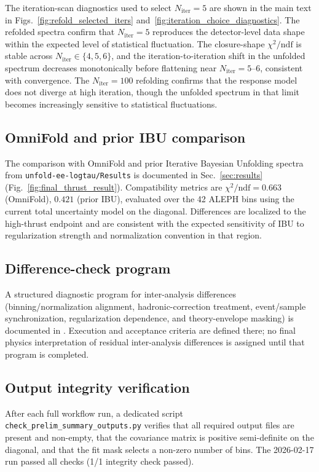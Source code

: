The iteration-scan diagnostics used to select $N_{\mathrm{iter}}=5$ are shown in the main text in Figs.~\ref{fig:refold_selected_iters} and~\ref{fig:iteration_choice_diagnostics}. The refolded spectra confirm that $N_{\mathrm{iter}}=5$ reproduces the detector-level data shape within the expected level of statistical fluctuation. The closure-shape $\chi^2/\mathrm{ndf}$ is stable across $N_\mathrm{iter}\in\{4,5,6\}$, and the iteration-to-iteration shift in the unfolded spectrum decreases monotonically before flattening near $N_\mathrm{iter}=5$--$6$, consistent with convergence. The $N_\mathrm{iter}=100$ refolding confirms that the response model does not diverge at high iteration, though the unfolded spectrum in that limit becomes increasingly sensitive to statistical fluctuations.

\subsection{OmniFold and prior IBU comparison}

The comparison with OmniFold and prior Iterative Bayesian Unfolding spectra from \texttt{unfold-ee-logtau/Results} is documented in Sec.~\ref{sec:results} (Fig.~\ref{fig:final_thrust_result}). Compatibility metrics are $\chi^2/\mathrm{ndf}=0.663$ (OmniFold), $0.421$ (prior IBU), evaluated over the 42 ALEPH bins using the current total uncertainty model on the diagonal. Differences are localized to the high-thrust endpoint and are consistent with the expected sensitivity of IBU to regularization strength and normalization convention in that region.

\subsection{Difference-check program}

A structured diagnostic program for inter-analysis differences (binning/normalization alignment, hadronic-correction treatment, event/sample synchronization, regularization dependence, and theory-envelope masking) is documented in . Execution and acceptance criteria are defined there; no final physics interpretation of residual inter-analysis differences is assigned until that program is completed.

\subsection{Output integrity verification}

After each full workflow run, a dedicated script \texttt{check\_prelim\_summary\_outputs.py} verifies that all required output files are present and non-empty, that the covariance matrix is positive semi-definite on the diagonal, and that the fit mask selects a non-zero number of bins. The 2026-02-17 run passed all checks (1/1 integrity check passed).
